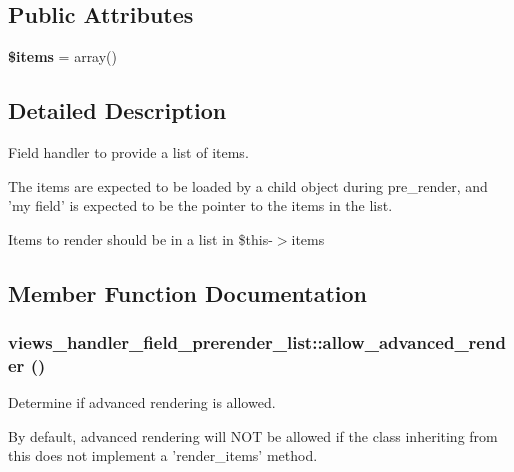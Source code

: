 \subsection*{Public Attributes}
\begin{DoxyCompactItemize}
\item 
\hypertarget{classviews__handler__field__prerender__list_a1f9ad248c3d8e6888a1fd570c159d821}{
{\bfseries \$items} = array()}
\label{classviews__handler__field__prerender__list_a1f9ad248c3d8e6888a1fd570c159d821}

\end{DoxyCompactItemize}


\subsection{Detailed Description}
Field handler to provide a list of items.

The items are expected to be loaded by a child object during pre\_\-render, and 'my field' is expected to be the pointer to the items in the list.

Items to render should be in a list in \$this-\/$>$items 

\subsection{Member Function Documentation}
\hypertarget{classviews__handler__field__prerender__list_a341b000d2b0e13c3819e47165ca33ec9}{
\subsubsection[{allow\_\-advanced\_\-render}]{\setlength{\rightskip}{0pt plus 5cm}views\_\-handler\_\-field\_\-prerender\_\-list::allow\_\-advanced\_\-render ()}}
\label{classviews__handler__field__prerender__list_a341b000d2b0e13c3819e47165ca33ec9}
Determine if advanced rendering is allowed.

By default, advanced rendering will NOT be allowed if the class inheriting from this does not implement a 'render\_\-items' method. 

